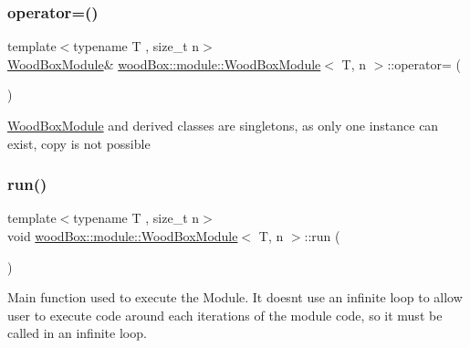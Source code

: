 \subsubsection{\texorpdfstring{operator=()}{operator=()}}
{\footnotesize\ttfamily template$<$typename T , size\+\_\+t n$>$ \\
\mbox{\hyperlink{classwood_box_1_1module_1_1_wood_box_module}{Wood\+Box\+Module}}\& \mbox{\hyperlink{classwood_box_1_1module_1_1_wood_box_module}{wood\+Box\+::module\+::\+Wood\+Box\+Module}}$<$ T, n $>$\+::operator= (\begin{DoxyParamCaption}\item[{const \mbox{\hyperlink{classwood_box_1_1module_1_1_wood_box_module}{Wood\+Box\+Module}}$<$ T, n $>$ \&}]{ }\end{DoxyParamCaption})\hspace{0.3cm}{\ttfamily [delete]}}

\mbox{\hyperlink{classwood_box_1_1module_1_1_wood_box_module}{Wood\+Box\+Module}} and derived classes are singletons, as only one instance can exist, copy is not possible \mbox{\label{classwood_box_1_1module_1_1_wood_box_module_ac65e58ab2338b1e3f57e4ce5d9e70c6c}} 
\subsubsection{\texorpdfstring{run()}{run()}}
{\footnotesize\ttfamily template$<$typename T , size\+\_\+t n$>$ \\
void \mbox{\hyperlink{classwood_box_1_1module_1_1_wood_box_module}{wood\+Box\+::module\+::\+Wood\+Box\+Module}}$<$ T, n $>$\+::run (\begin{DoxyParamCaption}{ }\end{DoxyParamCaption})\hspace{0.3cm}{\ttfamily [inline]}}

Main function used to execute the Module. It doesn\textquotesingle{}t use an infinite loop to allow user to execute code around each iterations of the module code, so it must be called in an infinite loop. \mbox{\label{classwood_box_1_1module_1_1_wood_box_module_ad40df0835ac2ffcec83cfb96d12f9079}} 
